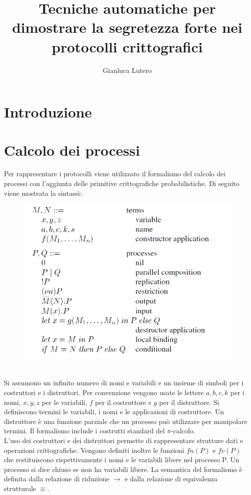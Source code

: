 \documentclass[12pt]{report}
\title{Tecniche automatiche per dimostrare la segretezza forte nei protocolli crittografici}
\author{Gianluca Lutero}
\begin{document}
\maketitle
\newpage

\newpage
{}
\section*{Introduzione}
\section*{Calcolo dei processi}
Per rappresentare i protocolli viene utilizzato il formalismo del calcolo dei processi con l'aggiunta delle primitive crittografiche probabilistiche. Di seguito viene mostrata la sintassi:\\
\begin{figure}[h]
    \centering
    \includegraphics[scale=0.5]{Relazione/Immagini/calcolo.PNG}
\end{figure}\\
Si assumono un infinito numero di nomi e variabili e un insieme di simboli per i costruttori e i distruttori. Per convenzione vengono usate le lettere $a, b, c, k$ per i nomi, $x, y, z$ per le variabili, $f$ per il costruttore e $g$ per il distruttore. Si definiscono termini le variabili, i nomi e le applicazioni di costruttore. Un distruttore è una funzione parziale che un processo può utilizzare per manipolare termini. Il formalismo include i costrutti standard del $\pi$-calcolo.\\
L'uso dei costruttori e dei distruttori permette di rappresentare strutture dati e operazioni crittografiche. Vengono definiti inoltre le funzioni $fn(P)$ e $fv(P)$ che restituiscono rispettivamente i nomi e le variabili libere nel processo P. Un processo si dice chiuso se non ha variabili libere. La semantica del formalismo è definita dalla relazione di riduzione $ \xrightarrow{} $ e dalla relazione di equivalenza strutturale $ \equiv$.
\end{document}
